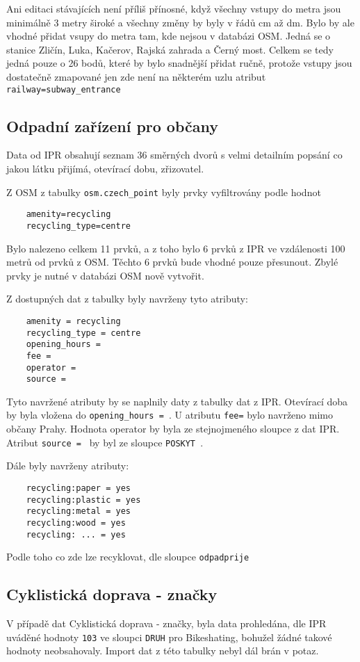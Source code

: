 Ani editaci stávajících není příliš přínosné, když všechny vstupy do metra jsou
minimálně 3 metry široké a všechny změny by byly v řádů cm až dm. 
Bylo by ale vhodné přidat vsupy do metra tam, kde nejsou v databázi OSM.
Jedná se o stanice Zličín, Luka, Kačerov, Rajská zahrada a Černý most. 
Celkem se tedy jedná pouze o 26 bodů, které by bylo snadnější přidat ručně, 
protože vstupy jsou dostatečně zmapované jen zde není na některém uzlu atribut
{\tt railway=subway\_entrance}


\subsection{Odpadní zařízení pro občany}
\label{Odpadní zařízení pro občany}
Data od IPR obsahují seznam 36 směrných dvorů s velmi detailním popsání co 
jakou látku přijímá, otevírací dobu, zřizovatel. 

Z OSM z tabulky {\tt osm.czech\_point} byly prvky vyfiltrovány podle hodnot 
\begin{verbatim}
    amenity=recycling
    recycling_type=centre
\end{verbatim}    
Bylo nalezeno celkem 11 prvků, a z toho bylo 6 prvků z IPR ve vzdálenosti 
100 metrů od prvků z OSM. Těchto 6 prvků bude vhodné pouze přesunout. Zbylé 
prvky je nutné v databázi OSM nově vytvořit.

Z dostupných dat z tabulky byly navrženy tyto atributy: 
\begin{verbatim}
    amenity = recycling
    recycling_type = centre
    opening_hours =
    fee =
    operator = 
    source = 
\end{verbatim}
Tyto navržené atributy by se naplnily daty z tabulky dat z IPR.
Otevírací doba by byla vložena do {\tt opening\_hours = }. U atributu {\tt fee=} 
bylo navrženo mimo občany Prahy. Hodnota {operator} by byla ze stejnojmeného 
sloupce z dat IPR. Atribut {\tt source = } by byl ze sloupce {\tt POSKYT }.

Dále byly navrženy atributy:
\begin{verbatim}
    recycling:paper = yes
    recycling:plastic = yes
    recycling:metal = yes
    recycling:wood = yes
    recycling: ... = yes
\end{verbatim}
Podle toho co zde lze recyklovat, dle sloupce {\tt odpadprije }

\subsection{Cyklistická doprava - značky}
\label{Cyklistická doprava - značky}
V případě dat Cyklistická doprava - značky, byla data prohledána, dle IPR 
uváděné hodnoty {\tt 103} ve sloupci {\tt DRUH} pro Bikeshating, bohužel žádné 
takové hodnoty neobsahovaly. Import dat z této tabulky nebyl dál brán v potaz.


